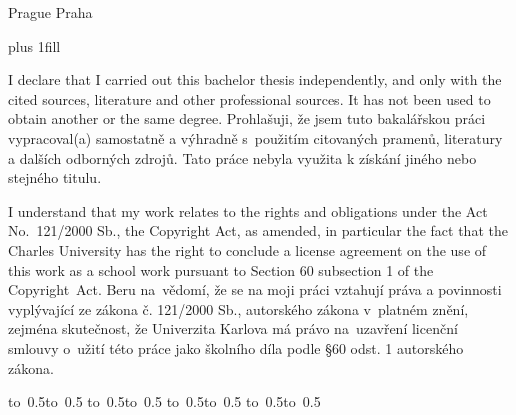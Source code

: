 \begin{center}
{\LARGE\bfseries\ThesisTitle}

\vfill

\Department

\vfill

{
\centerline{\vbox{}}}

\vfill

\ifEN Prague \else Praha \fi
\YearSubmitted

\end{center}

\newpage

\openright
\hypersetup{pageanchor=true}
\pagestyle{plain}
\vglue 0pt plus 1fill

\ifEN
\noindent
I declare that I carried out this bachelor thesis independently, and only with the cited
sources, literature and other professional sources. It has not been used to obtain another
or the same degree.
\else
\noindent
Prohlašuji, že jsem tuto bakalářskou práci vypracoval(a) samostatně a výhradně
s~použitím citovaných pramenů, literatury a dalších odborných zdrojů.
Tato práce nebyla využita k získání jiného nebo stejného titulu.
\fi

\ifEN
\medskip\noindent
I understand that my work relates to the rights and obligations under the Act No.~121/2000 Sb.,
the Copyright Act, as amended, in particular the fact that the Charles
University has the right to conclude a license agreement on the use of this
work as a school work pursuant to Section 60 subsection 1 of the Copyright~Act.
\else
\medskip\noindent
Beru na~vědomí, že se na moji práci vztahují práva a povinnosti vyplývající
ze zákona č. 121/2000 Sb., autorského zákona v~platném znění, zejména skutečnost,
že Univerzita Karlova má právo na~uzavření licenční smlouvy o~užití této
práce jako školního díla podle §60 odst. 1 autorského zákona.
\fi

\vspace{10mm}


\ifEN
\hbox{\hbox to 0.5\hbox to 0.5\hsize{\dotfill\quad}}
\smallskip
\hbox{\hbox to 0.5\hsize{}\hbox to 0.5}
\else
\hbox{\hbox to 0.5\hbox to 0.5\hsize{\dotfill\quad}}
\smallskip
\hbox{\hbox to 0.5\hsize{}\hbox to 0.5}
\fi

